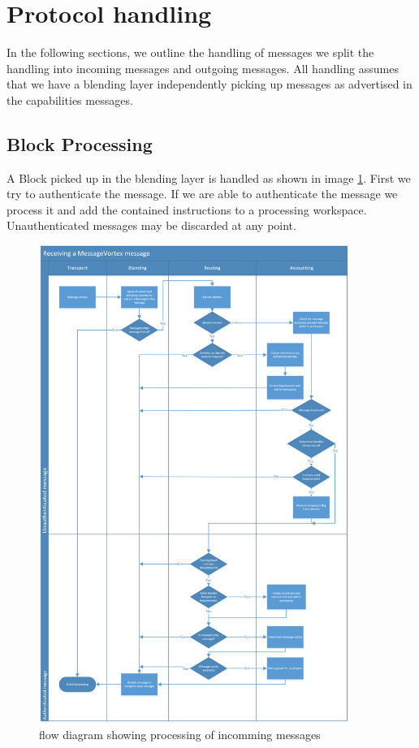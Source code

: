 \section{Protocol handling}
In the following sections, we outline the handling of messages we split the handling into incoming messages and outgoing messages. All handling assumes that we have a blending layer independently picking up messages as advertised in the capabilities messages.

\subsection{Block Processing}
A Block picked up in the blending layer is handled as shown in image \ref{fig:msgRecvProcessing}. First we try to authenticate the message. If we are able to authenticate the message we process it and add the contained instructions to a processing workspace. Unauthenticated messages may be discarded at any point.

\begin{figure}[hbt]
	\includegraphics[width=0.90\textwidth]{inc/flowchart_message_receiving}
	\caption{flow diagram showing processing of incomming messages}
	\label{fig:msgRecvProcessing}
\end{figure}

